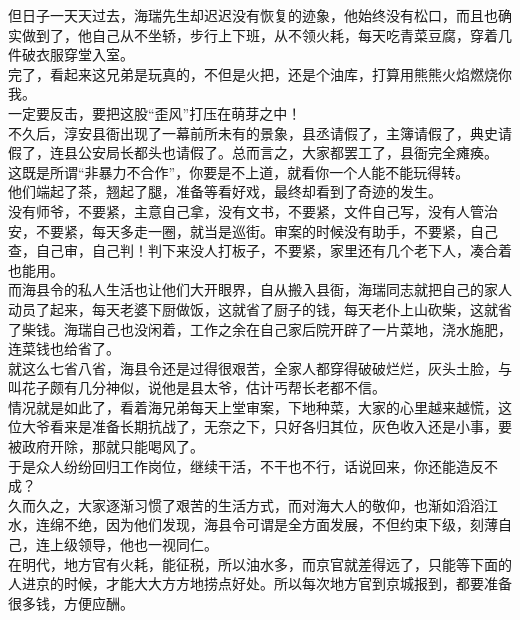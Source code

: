 \begin{multicols}{\theparacolNo}
但日子一天天过去，海瑞先生却迟迟没有恢复的迹象，他始终没有松口，而且也确实做到了，他自己从不坐轿，步行上下班，从不领火耗，每天吃青菜豆腐，穿着几件破衣服穿堂入室。\\

完了，看起来这兄弟是玩真的，不但是火把，还是个油库，打算用熊熊火焰燃烧你我。\\

一定要反击，要把这股“歪风”打压在萌芽之中！\\

不久后，淳安县衙出现了一幕前所未有的景象，县丞请假了，主簿请假了，典史请假了，连县公安局长都头也请假了。总而言之，大家都罢工了，县衙完全瘫痪。\\

这既是所谓“非暴力不合作”，你要是不上道，就看你一个人能不能玩得转。\\

他们端起了茶，翘起了腿，准备等看好戏，最终却看到了奇迹的发生。\\

没有师爷，不要紧，主意自己拿，没有文书，不要紧，文件自己写，没有人管治安，不要紧，每天多走一圈，就当是巡街。审案的时候没有助手，不要紧，自己查，自己审，自己判！判下来没人打板子，不要紧，家里还有几个老下人，凑合着也能用。\\

而海县令的私人生活也让他们大开眼界，自从搬入县衙，海瑞同志就把自己的家人动员了起来，每天老婆下厨做饭，这就省了厨子的钱，每天老仆上山砍柴，这就省了柴钱。海瑞自己也没闲着，工作之余在自己家后院开辟了一片菜地，浇水施肥，连菜钱也给省了。\\

就这么七省八省，海县令还是过得很艰苦，全家人都穿得破破烂烂，灰头土脸，与叫花子颇有几分神似，说他是县太爷，估计丐帮长老都不信。\\

情况就是如此了，看着海兄弟每天上堂审案，下地种菜，大家的心里越来越慌，这位大爷看来是准备长期抗战了，无奈之下，只好各归其位，灰色收入还是小事，要被政府开除，那就只能喝风了。\\

于是众人纷纷回归工作岗位，继续干活，不干也不行，话说回来，你还能造反不成？\\

久而久之，大家逐渐习惯了艰苦的生活方式，而对海大人的敬仰，也渐如滔滔江水，连绵不绝，因为他们发现，海县令可谓是全方面发展，不但约束下级，刻薄自己，连上级领导，他也一视同仁。\\

在明代，地方官有火耗，能征税，所以油水多，而京官就差得远了，只能等下面的人进京的时候，才能大大方方地捞点好处。所以每次地方官到京城报到，都要准备很多钱，方便应酬。\\


\end{multicols}

